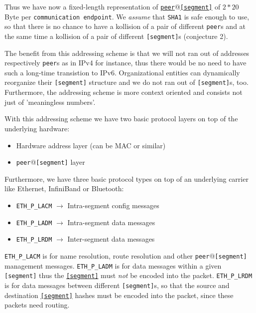 \documentclass[times,10pt,twocolumn]{article}
\begin{document}
Thus we have now a fixed-length representation of
\underline{\texttt{peer}}@\underline{\texttt{[segment]}} of $2*20$ Byte per
\texttt{communication endpoint}. We \textit{assume} that \texttt{SHA1} is
safe enough to use, so that there is no chance to have a kollision of a pair
of different \texttt{peer}s and at the same time a kollision of a pair of
different \texttt{[segment]}s (conjecture 2).\newline

The benefit from this addressing scheme is that we will not ran out 
of addresses respectively \texttt{peer}s as in IPv4 for instance, thus 
there would be no need to have such a long-time transistion to IPv6.
Organizational entities can dynamically reorganize their \texttt{[segment]} 
structure and we do not ran out of \texttt{[segment]}s, too. Furthermore,
the addressing scheme is more context oriented and consists not just of
'meaningless numbers'.

With this addressing scheme we have two basic protocol layers on top of the 
underlying hardware:
\begin{itemize}
	\setlength{\itemsep}{-1mm}
	\item Hardware address layer (can be MAC or similar)
	\item \texttt{peer}@\texttt{[segment]} layer
\end{itemize}

Furthermore, we have three basic protocol types on top of an underlying 
carrier like Ethernet, InfiniBand or Bluetooth:
\begin{itemize}
	\setlength{\itemsep}{-1mm}
	\item \texttt{ETH\_P\_LACM} $\rightarrow$ Intra-segment config messages
	\item \texttt{ETH\_P\_LADM} $\rightarrow$ Intra-segment data messages
	\item \texttt{ETH\_P\_LRDM} $\rightarrow$ Inter-segment data messages
\end{itemize}

\texttt{ETH\_P\_LACM} is for name resolution, route resolution and other 
\texttt{peer}@\texttt{[segment]} management messages. \texttt{ETH\_P\_LADM} is for data 
messages within a given \texttt{[segment]} thus the 
\underline{\texttt{[segment]}} must \textit{not} be encoded into the packet. 
\texttt{ETH\_P\_LRDM} is for data messages between different \texttt{[segment]}s, 
so that the source and destination \underline{\texttt{[segment]}}
hashes must be encoded into the packet, since these packets need
routing.\newline
\end{document}
